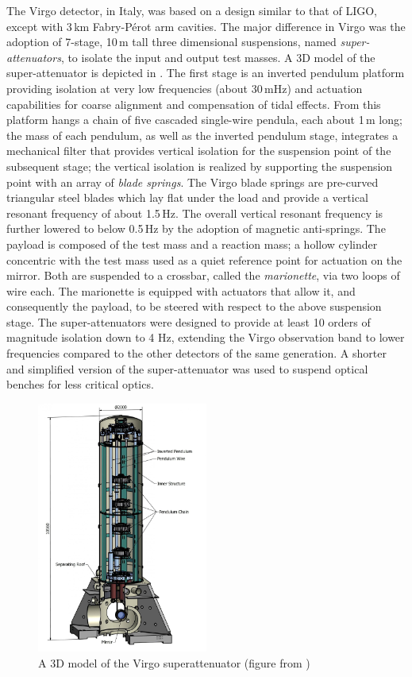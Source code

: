 The Virgo detector\cite{Accadia_2012}, in Italy, was based on a design similar to that of LIGO, except with 3\,km Fabry-P\'{e}rot arm cavities. 
The major difference in Virgo was the adoption of 7-stage, 10\,m tall three dimensional suspensions, named \textit{super-attenuators}, to isolate the input and output test masses.
A 3D model of the super-attenuator is depicted in . The first stage is an inverted pendulum platform providing isolation at very low frequencies (about 30\,mHz) and actuation capabilities for coarse alignment and compensation of tidal effects.
From this platform hangs a chain of five cascaded single-wire pendula, each about 1\,m long; the mass of each pendulum, as well as the inverted pendulum stage, integrates a mechanical filter that provides vertical isolation for the suspension point of the subsequent stage; the vertical isolation is realized by supporting the suspension point with an array of \textit{blade springs}.
The Virgo blade springs are pre-curved triangular steel blades which lay flat under the load and provide a vertical resonant frequency of about 1.5\,Hz.
The overall vertical resonant frequency is further lowered to below 0.5\,Hz by the adoption of magnetic anti-springs.
The payload is composed of the test mass and a reaction mass; a hollow cylinder concentric with the test mass used as a quiet reference point for actuation on the mirror. Both are suspended to a crossbar, called the \textit{marionette}, via two loops of wire each.
The marionette is equipped with actuators that allow it, and consequently the payload, to be steered with respect to the above suspension stage. 
The super-attenuators were designed to provide at least 10 orders of magnitude isolation down to 4 Hz, extending the Virgo observation band to lower frequencies compared to the other detectors of the same generation.
A shorter and simplified version of the super-attenuator was used to suspend optical benches for less critical optics.

\begin{figure}
	\centering
	\includegraphics[width=0.5\textwidth]{superattenuator}
	\caption{\label{fig:superattenuator}A 3D model of the Virgo superattenuator (figure from \cite{Accadia_2012})}
\end{figure}

